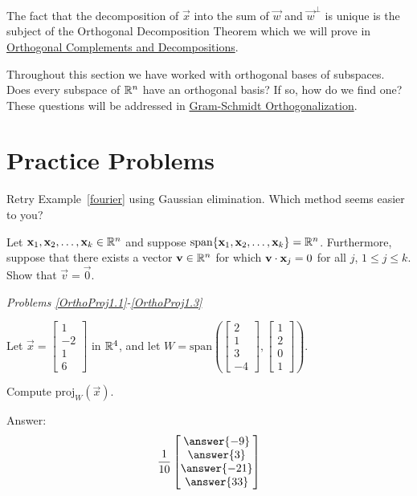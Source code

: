 \documentclass{ximera}
\begin{document}
The fact that the decomposition of $\vec{x}$ into the sum of $\vec{w}$ and $\vec{w}^\perp$ is unique is the subject of the Orthogonal Decomposition Theorem which we will prove in \href{\xmbaseurl/RTH-0020/main}{Orthogonal Complements and Decompositions}.

Throughout this section we have worked with orthogonal bases of subspaces.  Does every subspace of $\mathbb{R}^n$ have an orthogonal basis?  If so, how do we find one?  These questions will be addressed in \href{\xmbaseurl/RTH-0015/main}{Gram-Schmidt Orthogonalization}.

\section*{Practice Problems}
\begin{problem}\label{prob:rref_way}
Retry Example~\ref{fourier} using Gaussian elimination.  Which method seems easier to you?
\end{problem}

\begin{problem}\label{prob:vec_eq_0}
    Let $\mathbf{x}_1, \mathbf{x}_2, \ldots, \mathbf{x}_k\in\mathbb{R}^n$ and
suppose $\mbox{span}\{\mathbf{x}_1, \mathbf{x}_2, \ldots, \mathbf{x}_k\}=\mathbb{R}^n$.
Furthermore, suppose that there exists a vector $\mathbf{v}\in\mathbb{R}^n$ for which $\mathbf{v}\cdot \mathbf{x}_j=0$ for all $j$, $1\leq j\leq k$.
Show that $\vec{v}=\vec{0}$.
\end{problem}

\emph{Problems \ref{OrthoProj1.1}-\ref{OrthoProj1.3}}

Let $\vec{x} = \begin{bmatrix}1\\ -2\\ 1\\ 6\end{bmatrix}$ in $\mathbb{R}^4$, and let $W = \mbox{span}\left(\begin{bmatrix}2\\ 1\\ 3\\ -4\end{bmatrix}, \begin{bmatrix}1\\ 2\\ 0\\ 1\end{bmatrix}\right)$.

\begin{problem}\label{OrthoProj1.1}
Compute $\mbox{proj}_W(\vec{x})$.

Answer:  $$\frac{1}{10}\begin{bmatrix}\answer{-9}\\\answer{3}\\\answer{-21}\\\answer{33}\end{bmatrix}$$
\end{problem}
\end{document}

